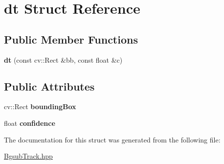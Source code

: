 \hypertarget{structdt}{}\section{dt Struct Reference}
\label{structdt}
\subsection*{Public Member Functions}
\begin{DoxyCompactItemize}
\item 
{\bfseries dt} (const cv\+::\+Rect \&bb, const float \&c)\hypertarget{structdt_ae4d00d21e1cb4c9a0af7bfeb4f72a316}{}\label{structdt_ae4d00d21e1cb4c9a0af7bfeb4f72a316}

\end{DoxyCompactItemize}
\subsection*{Public Attributes}
\begin{DoxyCompactItemize}
\item 
cv\+::\+Rect {\bfseries bounding\+Box}\hypertarget{structdt_ac3f1136a6808df1e785dfc94269d6dab}{}\label{structdt_ac3f1136a6808df1e785dfc94269d6dab}

\item 
float {\bfseries confidence}\hypertarget{structdt_a55251d07bf58bfbf46ed1ce6394b7b53}{}\label{structdt_a55251d07bf58bfbf46ed1ce6394b7b53}

\end{DoxyCompactItemize}


The documentation for this struct was generated from the following file\+:\begin{DoxyCompactItemize}
\item 
\hyperlink{BgsubTrack_8hpp}{Bgsub\+Track.\+hpp}\end{DoxyCompactItemize}
